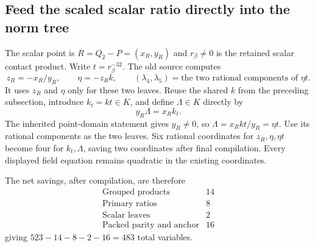 \subsection{Feed the scaled scalar ratio directly into the norm tree}
The scalar point is $R=Q_2-P=(x_R,y_R)$ and $r_\beta\ne0$ is the retained
scalar contact product. Write $t=r_\beta^{-32}$. The old source computes
\[
 z_R=-x_R/y_R,\qquad \eta=-z_R k,\qquad (\lambda_4,\lambda_5)
       =\text{the two rational components of }\eta t.
\]
It uses $z_R$ and $\eta$ only for these two leaves. Reuse the shared $k$
from the preceding subsection, introduce $k_t=kt\in K$, and define
$\Lambda\in K$ directly by
\[
 y_R\Lambda=x_Rk_t.
\]
The inherited point-domain statement gives $y_R\ne0$, so
$\Lambda=x_Rkt/y_R=\eta t$. Use its rational components as the two
leaves. Six rational coordinates for $z_R,\eta,\eta t$ become four for
$k_t,\Lambda$, saving two coordinates after final compilation. Every
displayed field equation remains quadratic in the existing coordinates.

The net savings, after compilation, are therefore
\[
\begin{array}{lr}
\text{Grouped products}&14\\
\text{Primary ratios}&8\\
\text{Scalar leaves}&2\\
\text{Packed parity and anchor}&16
\end{array}
\]
giving $523-14-8-2-16=483$ total variables.
